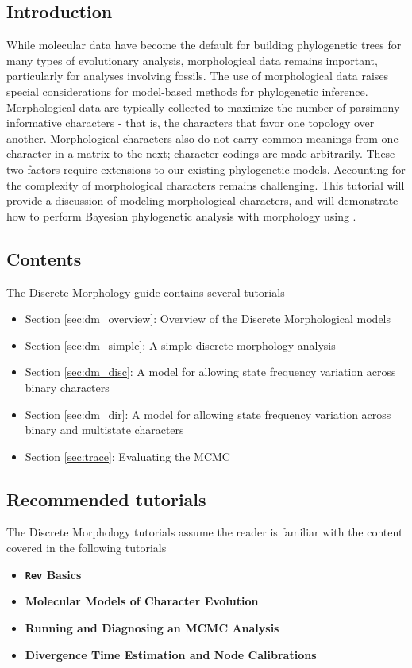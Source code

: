 \subsection*{Introduction}

While molecular data have become the default for building phylogenetic trees for many types of evolutionary analysis, morphological data remains important, particularly for analyses involving fossils. The use of morphological data  raises special considerations for model-based methods for phylogenetic inference. Morphological data are typically collected to maximize the number of parsimony-informative characters -  that is, the characters that favor one topology over another.  Morphological characters also do not carry common meanings from one character in a matrix to the next; character codings are made arbitrarily. These two factors require extensions to our existing phylogenetic models. Accounting for the complexity of morphological characters remains challenging. This tutorial will provide a discussion of modeling morphological characters, and will demonstrate how to perform Bayesian phylogenetic analysis with morphology using . 

\subsection*{Contents}

The Discrete Morphology guide contains several tutorials

\begin{itemize}
\item Section \ref{sec:dm_overview}: Overview of the Discrete Morphological models
\item Section \ref{sec:dm_simple}: A simple discrete morphology analysis
\item Section \ref{sec:dm_disc}: A model for allowing state frequency variation across binary characters
\item Section \ref{sec:dm_dir}: A model for allowing state frequency variation across binary and multistate characters
\item Section \ref{sec:trace}: Evaluating the MCMC \end{itemize}

\subsection*{Recommended tutorials}

The Discrete Morphology tutorials assume the reader is familiar with the content covered in the following \RevBayes tutorials

\begin{itemize}
\item {\bf {\tt \large Rev} Basics}
\item {\bf Molecular Models of Character Evolution}
\item {\bf Running and Diagnosing an MCMC Analysis}
\item {\bf Divergence Time Estimation and Node Calibrations}
\end{itemize}

\newpage

